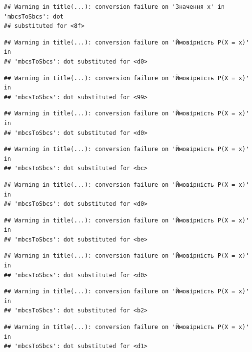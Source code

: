 \documentclass[
  11pt,
]{book}
\begin{document}
\begin{verbatim}
## Warning in title(...): conversion failure on 'Значення x' in 'mbcsToSbcs': dot
## substituted for <8f>
\end{verbatim}

\begin{verbatim}
## Warning in title(...): conversion failure on 'Ймовірність P(X = x)' in
## 'mbcsToSbcs': dot substituted for <d0>
\end{verbatim}

\begin{verbatim}
## Warning in title(...): conversion failure on 'Ймовірність P(X = x)' in
## 'mbcsToSbcs': dot substituted for <99>
\end{verbatim}

\begin{verbatim}
## Warning in title(...): conversion failure on 'Ймовірність P(X = x)' in
## 'mbcsToSbcs': dot substituted for <d0>
\end{verbatim}

\begin{verbatim}
## Warning in title(...): conversion failure on 'Ймовірність P(X = x)' in
## 'mbcsToSbcs': dot substituted for <bc>
\end{verbatim}

\begin{verbatim}
## Warning in title(...): conversion failure on 'Ймовірність P(X = x)' in
## 'mbcsToSbcs': dot substituted for <d0>
\end{verbatim}

\begin{verbatim}
## Warning in title(...): conversion failure on 'Ймовірність P(X = x)' in
## 'mbcsToSbcs': dot substituted for <be>
\end{verbatim}

\begin{verbatim}
## Warning in title(...): conversion failure on 'Ймовірність P(X = x)' in
## 'mbcsToSbcs': dot substituted for <d0>
\end{verbatim}

\begin{verbatim}
## Warning in title(...): conversion failure on 'Ймовірність P(X = x)' in
## 'mbcsToSbcs': dot substituted for <b2>
\end{verbatim}

\begin{verbatim}
## Warning in title(...): conversion failure on 'Ймовірність P(X = x)' in
## 'mbcsToSbcs': dot substituted for <d1>
\end{verbatim}
\end{document}

